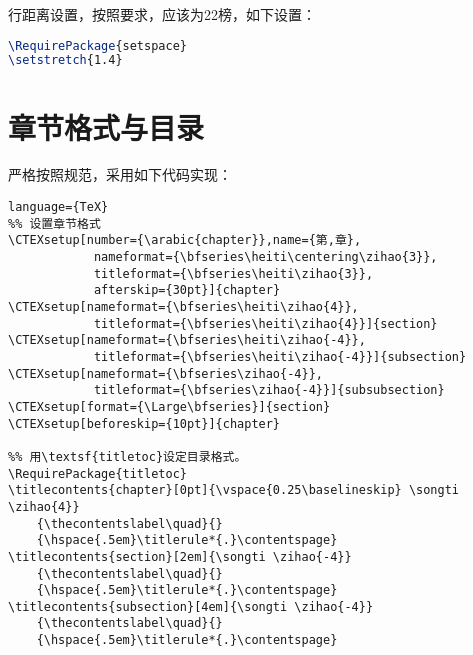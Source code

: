 行距离设置，按照要求，应该为22榜，如下设置：
\begin{lstlisting}[language={TeX}]
\RequirePackage{setspace}
\setstretch{1.4}

\end{lstlisting}

\section{章节格式与目录}
严格按照规范，采用如下代码实现：
\begin{lstlisting}language={TeX}
%% 设置章节格式
\CTEXsetup[number={\arabic{chapter}},name={第,章},
            nameformat={\bfseries\heiti\centering\zihao{3}},
            titleformat={\bfseries\heiti\zihao{3}},
            afterskip={30pt}]{chapter}
\CTEXsetup[nameformat={\bfseries\heiti\zihao{4}},
            titleformat={\bfseries\heiti\zihao{4}}]{section}
\CTEXsetup[nameformat={\bfseries\heiti\zihao{-4}},
            titleformat={\bfseries\heiti\zihao{-4}}]{subsection}
\CTEXsetup[nameformat={\bfseries\zihao{-4}},
            titleformat={\bfseries\zihao{-4}}]{subsubsection}
\CTEXsetup[format={\Large\bfseries}]{section}
\CTEXsetup[beforeskip={10pt}]{chapter}

%% 用\textsf{titletoc}设定目录格式。
\RequirePackage{titletoc}
\titlecontents{chapter}[0pt]{\vspace{0.25\baselineskip} \songti \zihao{4}}
    {\thecontentslabel\quad}{}
    {\hspace{.5em}\titlerule*{.}\contentspage}
\titlecontents{section}[2em]{\songti \zihao{-4}}
    {\thecontentslabel\quad}{}
    {\hspace{.5em}\titlerule*{.}\contentspage}
\titlecontents{subsection}[4em]{\songti \zihao{-4}}
    {\thecontentslabel\quad}{}
    {\hspace{.5em}\titlerule*{.}\contentspage}
    
\end{lstlisting}

